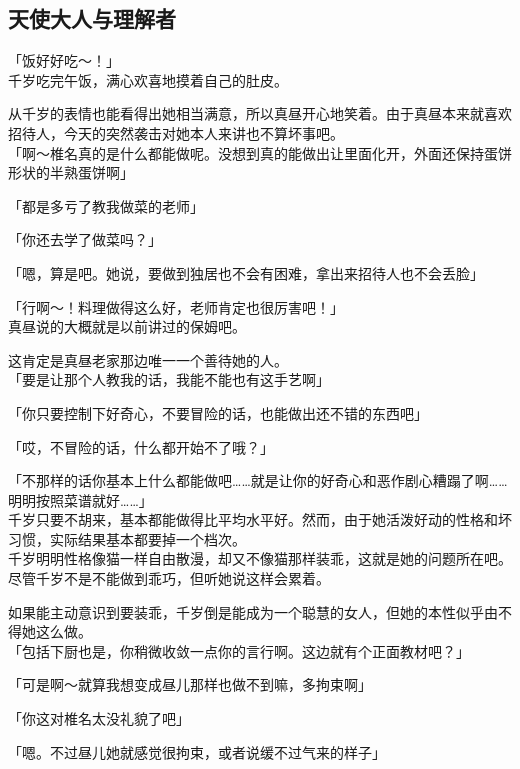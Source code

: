 \subsection{天使大人与理解者}

「饭好好吃～！」\\

千岁吃完午饭，满心欢喜地摸着自己的肚皮。

从千岁的表情也能看得出她相当满意，所以真昼开心地笑着。由于真昼本来就喜欢招待人，今天的突然袭击对她本人来讲也不算坏事吧。\\

「啊～椎名真的是什么都能做呢。没想到真的能做出让里面化开，外面还保持蛋饼形状的半熟蛋饼啊」

「都是多亏了教我做菜的老师」

「你还去学了做菜吗？」

「嗯，算是吧。她说，要做到独居也不会有困难，拿出来招待人也不会丢脸」

「行啊～！料理做得这么好，老师肯定也很厉害吧！」\\

真昼说的大概就是以前讲过的保姆吧。

这肯定是真昼老家那边唯一一个善待她的人。\\

「要是让那个人教我的话，我能不能也有这手艺啊」

「你只要控制下好奇心，不要冒险的话，也能做出还不错的东西吧」

「哎，不冒险的话，什么都开始不了哦？」

「不那样的话你基本上什么都能做吧……就是让你的好奇心和恶作剧心糟蹋了啊……明明按照菜谱就好……」\\

千岁只要不胡来，基本都能做得比平均水平好。然而，由于她活泼好动的性格和坏习惯，实际结果基本都要掉一个档次。\\

千岁明明性格像猫一样自由散漫，却又不像猫那样装乖，这就是她的问题所在吧。尽管千岁不是不能做到乖巧，但听她说这样会累着。

如果能主动意识到要装乖，千岁倒是能成为一个聪慧的女人，但她的本性似乎由不得她这么做。\\

「包括下厨也是，你稍微收敛一点你的言行啊。这边就有个正面教材吧？」

「可是啊～就算我想变成昼儿那样也做不到嘛，多拘束啊」

「你这对椎名太没礼貌了吧」

「嗯。不过昼儿她就感觉很拘束，或者说缓不过气来的样子」\\

